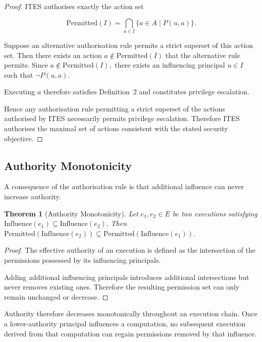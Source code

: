 \documentclass{article} %
\newtheorem{theorem}{Theorem}
\begin{document}
\begin{proof}
ITES authorises exactly the action set

\[
\mathrm{Permitted}(I)
=
\bigcap_{u\in I}
\{a\in A\mid P(u,a)\}.
\]

Suppose an alternative authorisation rule permits a strict superset of this action set. Then there exists an action
\(
a\notin\mathrm{Permitted}(I)
\)
that the alternative rule permits.
Since
\(
a\notin\mathrm{Permitted}(I),
\)
there exists an influencing principal
\(
u\in I
\)
such that
\(
\neg P(u,a).
\)

Executing \(a\) therefore satisfies Definition~2 and constitutes privilege escalation.

Hence any authorisation rule permitting a strict superset of the actions authorised by ITES necessarily permits privilege escalation. Therefore ITES authorises the maximal set of actions consistent with the stated security objective.
\end{proof}

\subsection{Authority Monotonicity}

A consequence of the authorisation rule is that additional influence can never increase authority.

\begin{theorem}[Authority Monotonicity]
Let \(e_1,e_2\in E\) be two executions satisfying
\(
\mathrm{Influence}(e_1)
\subseteq
\mathrm{Influence}(e_2).
\)
Then
\(
\mathrm{Permitted}
(\mathrm{Influence}(e_2))
\subseteq
\mathrm{Permitted}
(\mathrm{Influence}(e_1)).
\)

\end{theorem}

\begin{proof}
The effective authority of an execution is defined as the intersection of the permissions possessed by its influencing principals.

Adding additional influencing principals introduces additional intersections but never removes existing ones. Therefore the resulting permission set can only remain unchanged or decrease.
\end{proof}

Authority therefore decreases monotonically throughout an execution chain. Once a lower-authority principal influences a computation, no subsequent execution derived from that computation can regain permissions removed by that influence.
\end{document}

